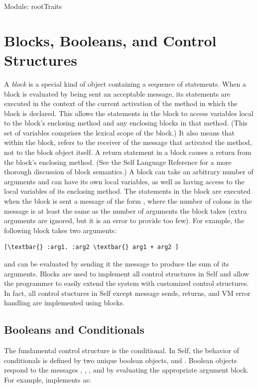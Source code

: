 \documentclass[letterpaper,10pt,english]{sphinxmanual}
\begin{document}
Module: rootTraits


\section{Blocks, Booleans, and Control Structures}
\label{blocks:blocks-booleans-and-control-structures}\label{blocks::doc}
A \emph{block} is a special kind of object containing a sequence of statements. When a block is evaluated
by being sent an acceptable  message, its statements are executed in the context of the current
activation of the method in which the block is declared. This allows the statements in the block
to access variables local to the block’s enclosing method and any enclosing blocks in that method.
(This set of variables comprises the lexical scope of the block.) It also means that within the block,
 refers to the receiver of the message that activated the method, not to the block object itself.
A return statement in a block causes a return from the block’s enclosing method. (See the Self
Language Reference for a more thorough discussion of block semantics.)
A block can take an arbitrary number of arguments and can have its own local variables, as well as
having access to the local variables of its enclosing method. The statements in the block are executed
when the block is sent a message of the form , where the number of colons
in the message is at least the same as the number of arguments the block takes (extra
arguments are ignored, but it is an error to provide too few). For example, the following block takes
two arguments:

\begin{Verbatim}[commandchars=\\\{\}]
[\textbar{} :arg1. :arg2 \textbar{} arg1 + arg2 ]
\end{Verbatim}

and can be evaluated by sending it the message  to produce the sum of its arguments.
Blocks are used to implement all control structures in Self and allow the programmer to
easily extend the system with customized control structures. In fact, all control stuctures in Self
except message sends, returns, and VM error handling are implemented using blocks.


\subsection{Booleans and Conditionals}
\label{blocks:booleans-and-conditionals}
The fundamental control structure is the conditional. In Self, the behavior of conditionals is defined
by two unique boolean objects,  and . Boolean objects respond to the messages
, , , and  by evaluating the appropriate argument
block. For example,  implements  as:
\end{document}
